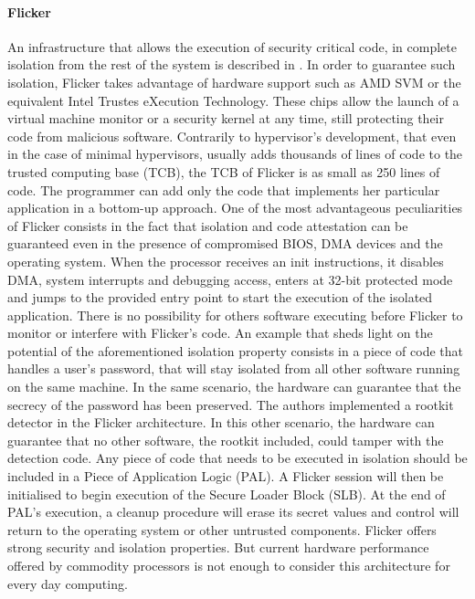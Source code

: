 \paragraph{Flicker}
An infrastructure that allows the execution of security critical code, in complete isolation from the rest of the system is described in \cite{flicker}. In order to guarantee such isolation, Flicker takes advantage of hardware support such as AMD SVM or the equivalent Intel Trustes eXecution Technology. These chips allow the launch of a virtual machine monitor or a security kernel at any time, still protecting their code from malicious software.
Contrarily to hypervisor's development, that even in the case of minimal hypervisors, usually adds thousands of lines of code to the trusted computing base (TCB), the TCB of Flicker is as small as 250 lines of code. The programmer can add only the code that implements her particular application in a bottom-up approach. 
One of the most advantageous peculiarities of Flicker consists in the fact that isolation and code attestation can be guaranteed even in the presence of compromised BIOS, DMA devices and the operating system. 
When the processor receives an init instructions, it disables DMA, system interrupts and debugging access, enters at 32-bit protected mode and jumps to the provided entry point to start the execution of the isolated application.
There is no possibility for others software executing before Flicker to monitor or interfere with Flicker's code.
An example that sheds light on the potential of the aforementioned isolation property consists in a piece of code that handles a user's password, that will stay isolated from all other software running on the same machine. In the same scenario, the hardware can guarantee that the secrecy of the password has been preserved.  
The authors implemented a rootkit detector in the Flicker architecture. In this other scenario, the hardware can guarantee that no other software, the rootkit included, could tamper with the detection code. 
Any piece of code that needs to be executed in isolation should be included in a Piece of Application Logic (PAL). A Flicker session will then be initialised to begin execution of the Secure Loader Block (SLB). At the end of PAL's execution, a cleanup procedure will erase its secret values and control will return to the operating system or other untrusted components. 
Flicker offers strong security and isolation properties. But current hardware performance offered by commodity processors is not enough to consider this architecture for every day computing. 



